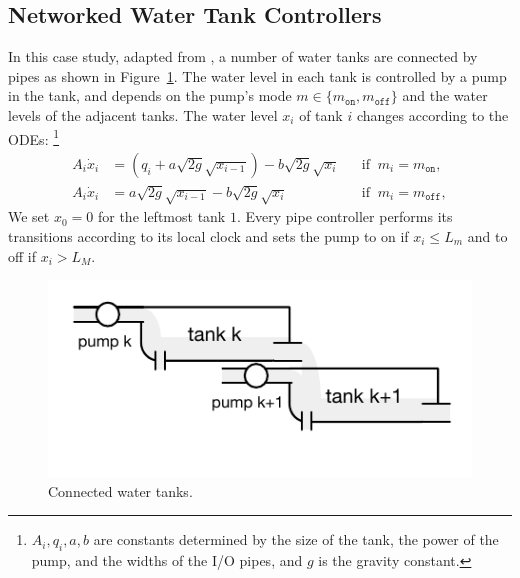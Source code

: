 \subsection{Networked Water Tank Controllers}

In this case study, adapted from
\cite{kowalewski1999case,raisch1999approximating}, 
a number of water tanks are connected by pipes as shown in
Figure~\ref{fig:water}.  
The water level in each tank is controlled by a pump in the tank, and 
 depends on the pump's mode $m \in \{m_\texttt{on}, m_\texttt{off}\}$
and the water levels of the adjacent tanks.
The water level $x_i$ of tank $i$ changes according to the ODEs:%
\footnote{%
$A_i, q_i, a, b $ are constants determined by the size of the tank, the power of the pump, 
and the widths of the I/O pipes,
and $g$ is the %
gravity constant.}
\[
\begin{aligned}
A_i \dot{x}_i &=  (q_i + a \sqrt{2g} \sqrt{x_{i-1}})  - b \sqrt{2g} \sqrt{x_i}
&& \mbox{if}\;\; m_i = m_\texttt{on},
\\
A_i \dot{x}_i &= a \sqrt{2g} \sqrt{x_{i-1}}  - b \sqrt{2g} \sqrt{x_i}
&& \mbox{if}\;\; m_i = m_\texttt{off},
\end{aligned}
\]
We set $x_0 = 0$ for the leftmost tank $1$.
%
Every pipe controller performs its transitions according to its local
clock and sets  
the pump to on if $x_i \leq L_m$ and to off if $x_i > L_M$.

\begin{figure}
\centering
\includegraphics[clip=true,trim=0.3cm 0.35cm 0.3cm 0.35cm,width=0.6\columnwidth]{water.pdf}    
\caption{Connected water tanks.}  \label{fig:water}
\end{figure}

